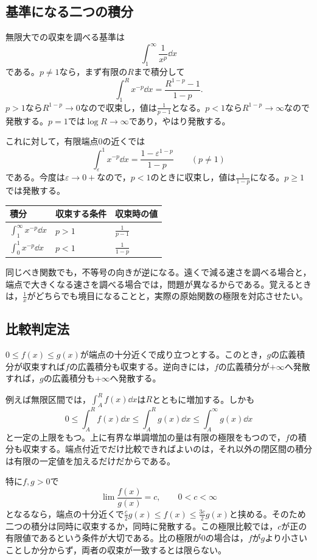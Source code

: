 \subsection{基準になる二つの積分}

無限大での収束を調べる基準は
\[
 \int_1^{\infty}\frac1{x^p}\dd x
\]
である。$p\ne1$なら，まず有限の$R$まで積分して
\[
 \int_1^R x^{-p}\dd x=\frac{R^{1-p}-1}{1-p}.
\]
$p>1$なら$R^{1-p}\to0$なので収束し，値は$\frac1{p-1}$となる。$p<1$なら$R^{1-p}\to\infty$なので発散する。$p=1$では$\log R\to\infty$であり，やはり発散する。

これに対して，有限端点$0$の近くでは
\[
 \int_{\varepsilon}^{1}x^{-p}\dd x
 =\frac{1-\varepsilon^{1-p}}{1-p}\qquad(p\ne1)
\]
である。今度は$\varepsilon\to0+$なので，$p<1$のときに収束し，値は$\frac1{1-p}$になる。$p\geq1$では発散する。

\begin{center}
\begin{tabular}{lll}
\toprule
積分 & 収束する条件 & 収束時の値\\
\midrule
$\int_1^{\infty}x^{-p}\dd x$ & $p>1$ & $\frac1{p-1}$\\[4pt]
$\int_0^1x^{-p}\dd x$ & $p<1$ & $\frac1{1-p}$\\
\bottomrule
\end{tabular}
\end{center}

同じべき関数でも，不等号の向きが逆になる。遠くで減る速さを調べる場合と，端点で大きくなる速さを調べる場合では，問題が異なるからである。覚えるときは，$\frac1x$がどちらでも境目になることと，実際の原始関数の極限を対応させたい。

\subsection{比較判定法}

$0\leq f(x)\leq g(x)$が端点の十分近くで成り立つとする。このとき，$g$の広義積分が収束すれば$f$の広義積分も収束する。逆向きには，$f$の広義積分が$+\infty$へ発散すれば，$g$の広義積分も$+\infty$へ発散する。

例えば無限区間では，$\int_A^R f(x)\dd x$は$R$とともに増加する。しかも
\[
 0\leq\int_A^Rf(x)\dd x\leq\int_A^Rg(x)\dd x
 \leq\int_A^{\infty}g(x)\dd x
\]
と一定の上限をもつ。上に有界な単調増加の量は有限の極限をもつので，$f$の積分も収束する。端点付近でだけ比較できればよいのは，それ以外の閉区間の積分は有限の一定値を加えるだけだからである。

特に$f,g>0$で
\[
 \lim\frac{f(x)}{g(x)}=c,\qquad0<c<\infty
\]
となるなら，端点の十分近くで$\frac c2g(x)\leq f(x)\leq\frac{3c}{2}g(x)$と挟める。そのため二つの積分は同時に収束するか，同時に発散する。この極限比較では，$c$が正の有限値であるという条件が大切である。比の極限が$0$の場合は，$f$が$g$より小さいことしか分からず，両者の収束が一致するとは限らない。

